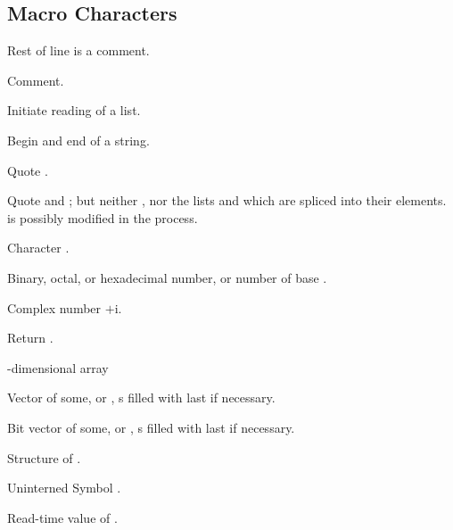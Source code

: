 \subsection{Macro Characters}

\begin{LIST}{1cm}

  Rest of line is a comment.

  Comment.

  \IT{\KWD*{(}}
  Initiate reading of a list.

  Begin and end of a string.

   Quote .

  Quote  and ; but neither , nor the lists
   and  which are spliced into their
  elements.  is possibly modified in the process.

  Character .

  Binary, octal, or hexadecimal number, or number of base . 

   Complex number $+$i.

  Return .

  -dimensional array

  \index{\#(}%
  Vector of some, or ,
  s filled with last  if necessary.

  \index{\#*}%
  Bit vector of some, or ,
  s filled with last  if necessary.

  Structure of .

  Uninterned Symbol .

  Read-time value of .


\end{LIST}
